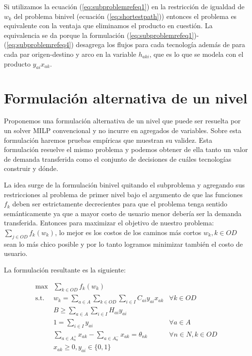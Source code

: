Si utilizamos la ecuación (\ref{eq:subproblemrefeq1}) en la restricción de igualdad de $w_k$ del problema binivel (ecuación (\ref{eq:shortestpath})) entonces el problema es equivalente con la ventaja que eliminamos el producto en cuestión. La equivalencia se da porque la formulación (\ref{eq:subproblemrefeq1})-(\ref{eq:subproblemrefeq4}) desagrega los flujos para cada tecnología además de para cada par origen-destino y arco en la variable $h_{aki}$, que es lo que se modela con el producto $y_{ai} x_{ak}$.

\section{Formulación alternativa de un nivel}
\label{sect:singlelevelformulation}

Proponemos una formulación alternativa de un nivel que puede ser resuelta por un solver MILP convencional y no incurre en agregados de variables. Sobre esta formulación haremos pruebas empíricas que muestran su validez. Esta formulación resuelve el mismo problema y podemos obtener de ella tanto un valor de demanda transferida como el conjunto de decisiones de cuáles tecnologías construir y dónde.

La idea surge de la formulación binivel quitando el subproblema y agregando sus restricciones al problema de primer nivel bajo el argumento de que las funciones $f_k$ deben ser estrictamente decrecientes para que el problema tenga sentido semánticamente ya que a mayor costo de usuario menor debería ser la demanda transferida. Entonces para maximizar el objetivo de nuestro problema: $\sum_{j \in OD}f_k(w_k)$, lo mejor es los costos de los caminos más cortos $w_k, k \in OD$ sean lo más chico posible y por lo tanto logramos minimizar también el costo de usuario.

La formulación resultante es la siguiente:

\begin{align}
  \max          & \sum_{k \in OD} f_k(w_k)                                                         & \label{eq:objectivealt} \\
  \text{s.t.}\; & w_k = \sum_{a \in A} \sum_{k \in OD} \sum_{i \in I} C_{ai}y_{ai}x_{ak}           & \forall k \in OD \label{eq:shortestpathalt} \\
                & B \geq \sum_{a \in A} \sum_{i \in I} H_{ai}y_{ai}                                & \label{eq:respectbudgetalt} \\
                & 1 = \sum_{i \in I} y_{ai}                                                        & \forall a \in A \label{eq:alwaysoneyalt} \\
                & \sum_{a \in A_n^+} x_{ak} - \sum_{a \in A_n^-} x_{ak} = \theta_{nk}              & \forall n \in N, k \in OD \label{eq:flowbalancealt} \\
                & x_{ak} \geq 0, y_{ai} \in \{0,1\}                                    & \nonumber
\end{align}

